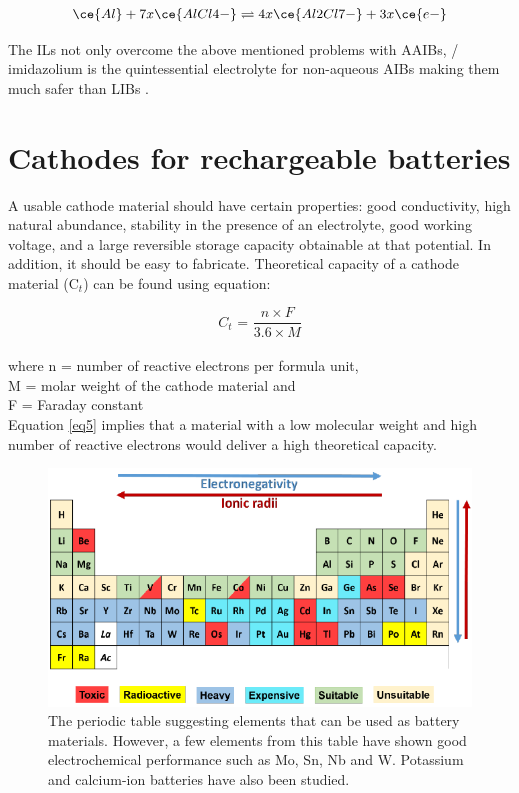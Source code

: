 \begin{align*}
        \ce{Al} + 7x\ce{AlCl4-} \rightleftharpoons 4x\ce{Al2Cl7-} + 3x\ce{e-}
\end{align*}

The ILs not only overcome the above mentioned problems with AAIBs, / imidazolium is the quintessential electrolyte for non-aqueous AIBs making them much safer than LIBs \cite{jayaprakash_rechargeable_2011, lin_ultrafast_2015,wang_new_2013-1,rani_fluorinated_2013}. 

\section{Cathodes for rechargeable batteries}
A usable cathode material should have certain properties: good conductivity, high natural abundance, stability in the presence of an electrolyte, good working voltage, and a large reversible storage capacity obtainable at that potential. In addition, it should be easy to fabricate. Theoretical capacity of a cathode material (C$_{t}$) can be found using equation:

\begin{equation} \label{eq5}
   C_{t} \text{ = } \frac{n \times F}{3.6 \times M}
\end{equation}\\
where n = number of reactive electrons per formula unit,\\
M = molar weight of the cathode material and\\
F = Faraday constant\\
Equation \ref{eq5} implies that a material with a low molecular weight and high number of reactive electrons would deliver a high theoretical capacity.

\begin{figure}[h!]
\centering
\includegraphics[width=\textwidth]{Figures/chap1fig/pertab.pdf}
\caption{The periodic table suggesting elements that can be used as battery materials. However, a few elements from this table have shown good electrochemical performance such as Mo, Sn, Nb and W. Potassium and calcium-ion batteries have also been studied.}
\label{Figures/chap1fig:pertab}
\end{figure}

